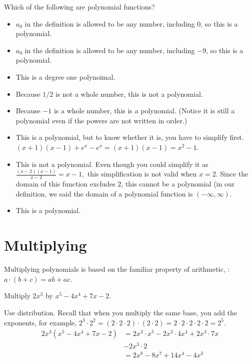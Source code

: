 \documentclass{ximera}
\begin{document}
\begin{question}
	Which of the following are polynomial functions?
	\begin{selectAll}
	\end{selectAll}
  \begin{feedback}\hfil
    \begin{itemize}
    \item $a_0$ in the definition is allowed to be any number, including $0$, so this is a polynomial. 
    \item $a_0$ in the definition is allowed to be any number, including $-9$, so this is a polynomial. 
    \item This is a degree one polynoimal.
    \item Because $1/2$ is not a whole number, this is not a polynomial.
    \item Because $-1$ is a whole number, this is a polynomial. (Notice it is still a polynomial even if the powers are not written in order.)
    \item This is a polynomial, but to know whether it is, you have to simplify first. $(x+1)(x-1)+e^x-e^x=(x+1)(x-1)=x^2-1$.
    \item This is not a polynomial. Even though you could simplify it as $\displaystyle \frac{(x-2)(x-1)}{x-2} = x-1,$ this simplification is not valid when $x=2$. Since the domain of this function excludes $2$, this cannot be a polynomial (in our definition, we said the domain of a polynomial function is $(-\infty,\infty)$.
\item This is a polynomial.
    \end{itemize}
  \end{feedback}
\end{question}


\section{Multiplying}

Multiplying polynomials is based on the familiar property of arithmetic, : $\displaystyle a\cdot( b + c ) = ab + ac$.
\begin{example}
	Multiply $2x^3$ by $x^5 - 4x^4 + 7x - 2$.
	\begin{explanation}
		Use distribution. Recall that when you multiply the same base, you add the exponents, for example, $2^3\cdot2^2=(2\cdot2\cdot2)\cdot(2\cdot2) = 2\cdot2\cdot2\cdot2\cdot2 = 2^5$.
		\begin{align*}
			2x^3 \left( x^5 - 4x^4 + 7x - 2 \right) &= 2x^3 \cdot x^5 - 2x^3 \cdot 4x^4 + 2x^3 \cdot 7x \\
				& - 2x^3 \cdot 2\\
				&= 2 x^8 - 8x^7 + 14x^4 - 4x^3
		\end{align*}
	\end{explanation}
\end{example}
\end{document}
